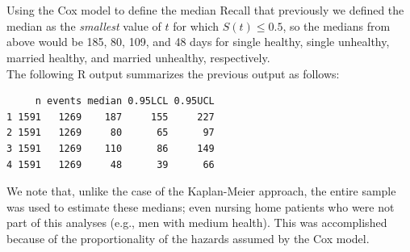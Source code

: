 \documentclass[envcountsect, 10pt, portrait, palatino]{beamer}
\begin{document}
\begin{frame}[fragile]{Using the Cox model to define the median}
Recall that previously we defined the median as the {\em smallest}
value of $t$ for which $\hat{S}(t)\leq 0.5$, so the
medians from above would be 185, 80, 109, and 48 days for
single healthy, single unhealthy, married healthy, and married unhealthy,
respectively.\\[2ex]
The following R output summarizes the previous output as follows:

\small
\begin{verbatim}
     n events median 0.95LCL 0.95UCL
1 1591   1269    187     155     227
2 1591   1269     80      65      97
3 1591   1269    110      86     149
4 1591   1269     48      39      66
\end{verbatim}
\normalsize
We note that, unlike the case of the Kaplan-Meier approach, the entire sample was used to estimate these medians; even nursing home patients who were not part of this analyses (e.g., men with medium health).  This was accomplished because of the proportionality of the hazards assumed by the Cox model.
\end{frame}
%
%
\end{document}
